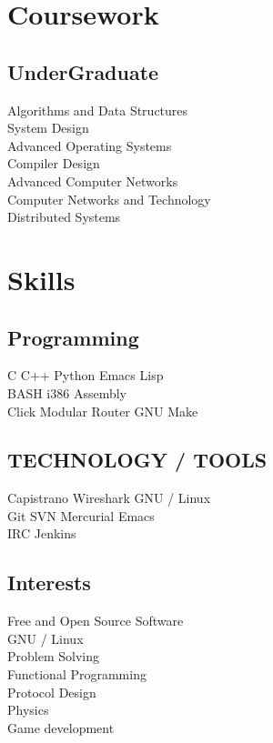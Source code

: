 \documentclass[letterpaper]{deedy-resume} %
\begin{document}
\begin{minipage}[t]{0.33\textwidth}
\section{Coursework}
\subsection{UnderGraduate}
Algorithms and Data Structures \\
System Design \\
Advanced Operating Systems \\
Compiler Design \\
Advanced Computer Networks \\
Computer Networks and Technology \\
Distributed Systems \\
\sectionspace %
\section{Skills}
\subsection{Programming}
C \textbullet{} C++ \textbullet{} Python \textbullet{} Emacs Lisp\\
BASH \textbullet{} i386 Assembly \\
Click Modular Router  \textbullet{} GNU Make \\
\sectionspace %
\subsection{TECHNOLOGY / TOOLS}
Capistrano \textbullet{} Wireshark \textbullet{} GNU / Linux \\ 
Git \textbullet{} SVN \textbullet{} Mercurial \textbullet{}  Emacs \\
IRC \textbullet{} Jenkins 
\sectionspace %
\subsection{Interests}
Free and Open Source Software \\
GNU / Linux \\
Problem Solving \\
Functional Programming \\
Protocol Design \\
Physics \\
Game development
\sectionspace %

\end{minipage} %
\end{document}
